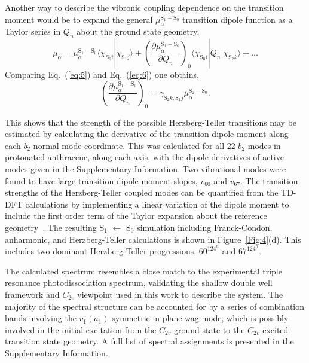 \documentclass[journal=jpcafh,manuscript=article,layout=onecolumn, 12pt]{achemso}
\begin{document}
Another way to describe the vibronic coupling dependence on the transition moment would be to expand the general $\mu_{\alpha}^{\text{S}_1-\text{S}_0}$ transition dipole function as a Taylor series in $Q_n$ about the ground state geometry,
\begin{equation}
\mu_{\alpha} = \mu_{\alpha}^{\text{S}_1-\text{S}_0}\langle\chi_{\text{S}_0i}|\chi_{\text{S}_1j}\rangle + \left(\frac{\partial\mu_{\alpha}^{\text{S}_1-\text{S}_0}}{\partial Q_n}\right)_0 \langle\chi_{\text{S}_0i}|Q_n|\chi_{\text{S}_2k}\rangle + \dots 
\label{eq:6}
\end{equation} 
Comparing Eq.~(\ref{eq:5}) and Eq.~(\ref{eq:6}) one obtains,
\begin{equation}
\left(\frac{\partial\mu_{\alpha}^{\text{S}_1-\text{S}_0}}{\partial Q_n}\right)_0 = \gamma_{\text{S}_2k,\text{S}_1j}\mu_{\alpha}^{\text{S}_2-\text{S}_0}.
\label{eq:7}
\end{equation}

This shows that the strength of the possible Herzberg-Teller transitions may be estimated by calculating the derivative of the transition dipole moment along each $b_2$ normal mode coordinate. This was calculated for all 22 $b_2$ modes in protonated anthracene, along each axis, with the dipole derivatives of active modes given in the Supplementary Information. Two vibrational modes were found to have large transition dipole moment slopes, $v_{60}$ and $v_{67}$. The transition strengths of the Herzberg-Teller coupled modes can be quantified from the TD-DFT calculations by implementing a linear variation of the dipole moment to include the first order term of the Taylor expansion about the reference geometry~\cite{bai13}. The resulting S$_1$ $\leftarrow$ S$_0$ simulation including Franck-Condon, anharmonic, and Herzberg-Teller calculations is shown in Figure~\ref{Fig:4}(d). This includes two dominant Herzberg-Teller progressions, $60^124^n$ and $67^124^n$. 


The calculated spectrum resembles a close match to the experimental triple resonance photodissociation spectrum, validating the shallow double well framework and $C_{2v}$ viewpoint used in this work to describe the system. The majority of the spectral structure can be accounted for by a series of combination bands involving the $v_1(a_1)$ symmetric in-plane wag mode, which is possibly involved in the initial excitation from the $C_{2v}$ ground state to the $C_{2v}$ excited transition state geometry. A full list of spectral assignments is presented in the Supplementary Information.
\end{document}

